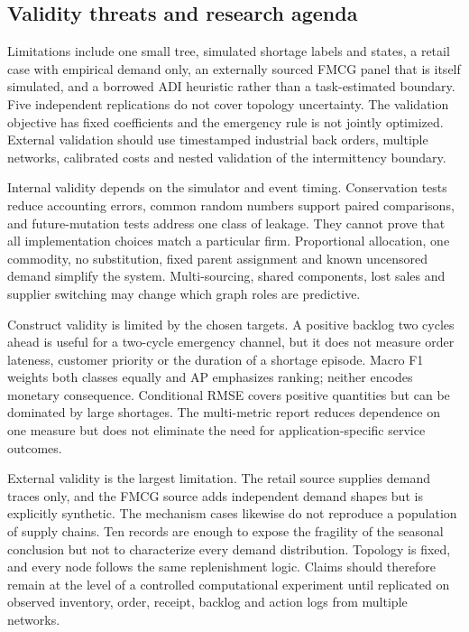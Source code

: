 \documentclass[11pt,a4paper]{article}
\begin{document}
\subsection{Validity threats and research agenda}

Limitations include one small tree, simulated shortage labels and states, a retail case with empirical demand only, an externally sourced FMCG panel that is itself simulated, and a borrowed ADI heuristic rather than a task-estimated boundary. Five independent replications do not cover topology uncertainty. The validation objective has fixed coefficients and the emergency rule is not jointly optimized. External validation should use timestamped industrial back orders, multiple networks, calibrated costs and nested validation of the intermittency boundary.

Internal validity depends on the simulator and event timing. Conservation tests reduce accounting errors, common random numbers support paired comparisons, and future-mutation tests address one class of leakage. They cannot prove that all implementation choices match a particular firm. Proportional allocation, one commodity, no substitution, fixed parent assignment and known uncensored demand simplify the system. Multi-sourcing, shared components, lost sales and supplier switching may change which graph roles are predictive.

Construct validity is limited by the chosen targets. A positive backlog two cycles ahead is useful for a two-cycle emergency channel, but it does not measure order lateness, customer priority or the duration of a shortage episode. Macro F1 weights both classes equally and AP emphasizes ranking; neither encodes monetary consequence. Conditional RMSE covers positive quantities but can be dominated by large shortages. The multi-metric report reduces dependence on one measure but does not eliminate the need for application-specific service outcomes.

External validity is the largest limitation. The retail source supplies demand traces only, and the FMCG source adds independent demand shapes but is explicitly synthetic. The mechanism cases likewise do not reproduce a population of supply chains. Ten records are enough to expose the fragility of the seasonal conclusion but not to characterize every demand distribution. Topology is fixed, and every node follows the same replenishment logic. Claims should therefore remain at the level of a controlled computational experiment until replicated on observed inventory, order, receipt, backlog and action logs from multiple networks.
\end{document}
